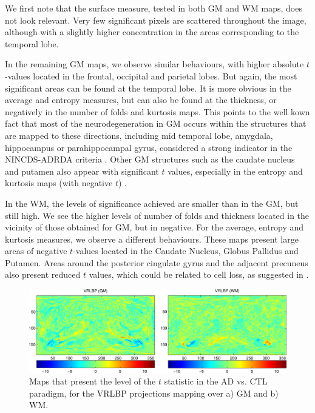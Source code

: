 We first note that the surface measure, tested in both \ac{GM} and \ac{WM} maps, does not look relevant. Very few significant pixels are scattered throughout the image, although with a slightly higher concentration in the areas corresponding to the temporal lobe. 

In the remaining \ac{GM} maps, we observe similar behaviours, with higher absolute $t$-values located in the frontal, occipital and parietal lobes. But again, the most significant areas can be found at the temporal lobe. It is more obvious in the average and entropy measures, but can also be found at the thickness, or negatively in the number of folds and kurtosis maps. This points to the well kown fact that most of the neurodegeneration in \ac{GM} occurs within the structures that are mapped to these directions, including mid temporal lobe, amygdala, hippocampus or parahippocampal gyrus, considered a strong indicator in the NINCDS-ADRDA criteria \cite{Dubois2007}. Other \ac{GM} structures such as the caudate nucleus and putamen also appear with significant $t$ values, especially in the entropy and kurtosis maps (with negative $t$) \cite{Pievani2013}. 

In the \ac{WM}, the levels of significance achieved are smaller than in the \ac{GM}, but still high. We see the higher levels of number of folds and thickness located in the vicinity of those obtained for \ac{GM}, but in negative. For the average, entropy and kurtosis measures, we observe a different behaviours. These maps present large areas of negative $t$-values located in the Caudate Nucleus, Globus Pallidus and Putamen. Areas around the posterior cingulate gyrus and the adjacent precuneus also present reduced $t$ values, which could be related to cell loss, as suggested in \cite{Baron2001}.

\begin{figure}[htp]
	\centering
	\includegraphics[width=\textwidth]{Graphics/ch6/09-tmaps_vrlbp}
	\caption[$t$-maps for the \acs{VRLBP}-\acs{SBM} in the \acs{AD} vs \acs{CTL} scenario.]{Maps that present the level of the $t$ statistic in the \ac{AD} vs. \ac{CTL} paradigm, for the VRLBP projections mapping over a) \ac{GM} and b) \ac{WM}. }
	\label{fig:tmapvrlbp}
\end{figure}

